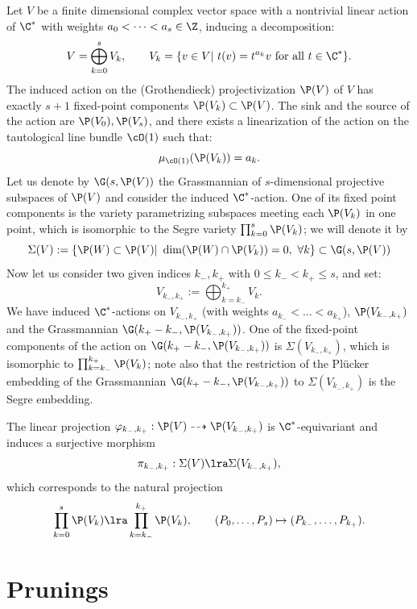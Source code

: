 \documentclass[reqno]{amsproc}
\theoremstyle{definition}
\begin{document}
Let $V$ be a finite dimensional complex vector space with a nontrivial linear action of $\C^*$ with weights $a_0<\dots<a_s\in\Z$, inducing a decomposition:
$$
V=\bigoplus_{k=0}^s V_k,\qquad V_k=\{v\in V|\,\, t(v)=t^{a_k}v\,\,\mbox{for all }t\in\C^*\}.
$$
The induced action on the (Grothendieck) projectivization $\P(V)$ of $V$ has exactly $s+1$ fixed-point components $\P(V_k)\subset \P(V)$. The sink and the source of the action are $\P(V_0),\P(V_s)$, and there exists a linearization of the action on the tautological line bundle $\cO(1)$ such that:
$$
\mu_{\cO(1)}(\P(V_k))=a_k.
$$ 
Let us denote by $\G(s,\P(V))$ the Grassmannian of $s$-dimensional projective subspaces of $\P(V)$ and consider the induced $\C^*$-action. One of its fixed point components is the variety parametrizing subspaces meeting each $\P(V_k)$ in one point, which is isomorphic to the Segre variety $\prod_{k=0}^s\P(V_k)$; we will denote it by  
\begin{equation}\label{eq:Sigma}\Sigma(V):=\{\P(W)\subset \P(V)|\,\, \dim(\P(W)\cap \P(V_k))=0,\,\, \forall k\}\subset \G(s,\P(V))\end{equation}
Now let us consider two given indices $k_-,k_+$ with $0\leq k_-<k_+\leq s$, and set:
$$
V_{k_-,k_+}:=\bigoplus_{k=k_-}^{k_+} V_k.
$$
We have induced $\C^*$-actions on $V_{k_-,k_+}$ (with weights $a_{k_-}<\dots<a_{k_+}$), $\P(V_{k_-,k_+})$ and the Grassmannian $\G(k_+-k_-,\P(V_{k_-,k_+}))$. One of the fixed-point components of the action on $\G(k_+-k_-,\P(V_{k_-,k_+}))$ is $\Sigma(V_{k_-,k_+})$, which is isomorphic to $\prod_{k=k_-}^{k_+}\P(V_k)$; note also that the restriction of the Pl\"ucker embedding of the Grassmannian  $\G(k_+-k_-,\P(V_{k_-,k_+}))$ to $\Sigma(V_{k_-,k_+})$ is the Segre embedding.


The linear projection $\varphi_{k_-,k_+}:\P(V)\dashrightarrow \P(V_{k_-,k_+})$ is $\C^*$-equivariant and induces a surjective morphism 
$$
\pi_{k_-,k_+}:\Sigma(V)\lra \Sigma(V_{k_-,k_+}),
$$ 
which corresponds to the natural projection $$\prod_{k=0}^s\P(V_k)\lra\prod_{k={k_-}}^{k_+}\P(V_k),\qquad (P_0,\dots,P_s)\mapsto (P_{k_-},\dots,P_{k_+}).$$




\section{Prunings}\label{sec:prun}
\end{document}
